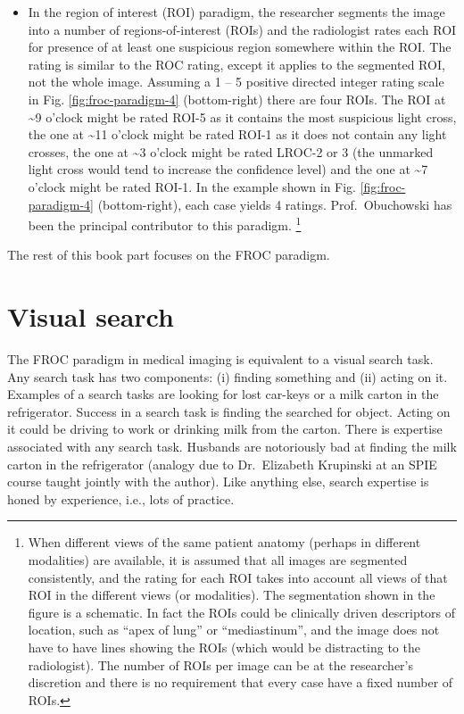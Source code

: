 \documentclass[
]{book}
\begin{document}
\begin{itemize}
\item
  In the region of interest (ROI) paradigm, the researcher segments the image into a number of regions-of-interest (ROIs) and the radiologist rates each ROI for presence of at least one suspicious region somewhere within the ROI. The rating is similar to the ROC rating, except it applies to the segmented ROI, not the whole image. Assuming a 1 -- 5 positive directed integer rating scale in Fig. \ref{fig:froc-paradigm-4} (bottom-right) there are four ROIs. The ROI at \textasciitilde9 o'clock might be rated ROI-5 as it contains the most suspicious light cross, the one at \textasciitilde11 o'clock might be rated ROI-1 as it does not contain any light crosses, the one at \textasciitilde3 o'clock might be rated LROC-2 or 3 (the unmarked light cross would tend to increase the confidence level) and the one at \textasciitilde7 o'clock might be rated ROI-1. In the example shown in Fig. \ref{fig:froc-paradigm-4} (bottom-right), each case yields 4 ratings. Prof.~Obuchowski has been the principal contributor to this paradigm. \footnote{When different views of the same patient anatomy (perhaps in different modalities) are available, it is assumed that all images are segmented consistently, and the rating for each ROI takes into account all views of that ROI in the different views (or modalities). The segmentation shown in the figure is a schematic. In fact the ROIs could be clinically driven descriptors of location, such as ``apex of lung'' or ``mediastinum'', and the image does not have to have lines showing the ROIs (which would be distracting to the radiologist). The number of ROIs per image can be at the researcher's discretion and there is no requirement that every case have a fixed number of ROIs.}
\end{itemize}

The rest of this book part focuses on the FROC paradigm.

\hypertarget{froc-paradigm-vis-search}{%
\section{Visual search}\label{froc-paradigm-vis-search}}

The FROC paradigm in medical imaging is equivalent to a visual search task. Any search task has two components: (i) finding something and (ii) acting on it. Examples of a search tasks are looking for lost car-keys or a milk carton in the refrigerator. Success in a search task is finding the searched for object. Acting on it could be driving to work or drinking milk from the carton. There is expertise associated with any search task. Husbands are notoriously bad at finding the milk carton in the refrigerator (analogy due to Dr.~Elizabeth Krupinski at an SPIE course taught jointly with the author). Like anything else, search expertise is honed by experience, i.e., lots of practice.
\end{document}
